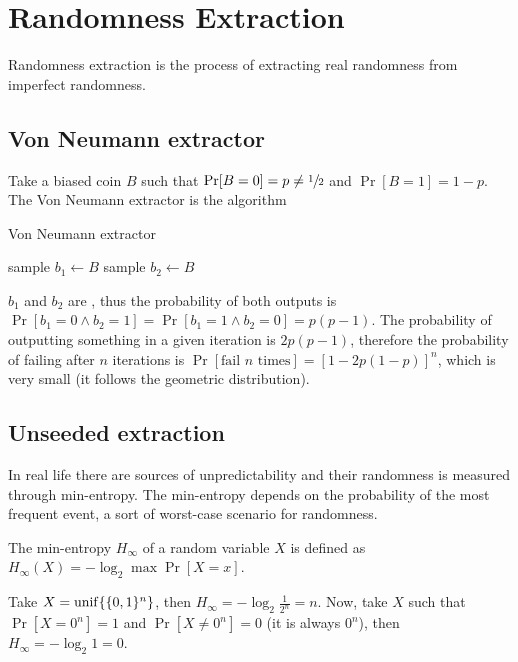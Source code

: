 
\section{Randomness Extraction}
Randomness extraction is the process of extracting real randomness from imperfect randomness.


\subsection{Von Neumann extractor}
Take a biased coin $B$ such that $\Pr[B = 0] = p \neq \sfrac{1}{2}$ and $\Pr[B = 1] = 1 - p$.
The Von Neumann extractor is the algorithm
%
\begin{algorithm}[H]
	\caption{Von Neumann extractor}\label{alg:von-neumann-extractor}
	\begin{algorithmic}
		\Do
			\State sample $b_1 \gets B$
			\State sample $b_2 \gets B$
	\end{algorithmic}
\end{algorithm}

$b_1$ and $b_2$ are \iid, thus the probability of both outputs is $\Pr[b_1 = 0 \wedge b_2 = 1] = \Pr[b_1 = 1 \wedge b_2 = 0] = p(p-1)$.
The probability of outputting something in a given iteration is $2p(p-1)$, therefore the probability of failing after $n$ iterations is $\Pr[\text{fail }n \text{ times}] = [1 -2p(1-p)]^n$, which is very small (it follows the geometric distribution).


\subsection{Unseeded extraction}
In real life there are sources of unpredictability and their randomness is measured through min-entropy.
The min-entropy depends on the probability of the most frequent event, a sort of worst-case scenario for randomness.

\begin{definition}
	The min-entropy $H_{\infty}$ of a random variable $X$ is defined as $H_{\infty}(X) = - \log_2 \max \Pr[X = x]$.
\end{definition}

\begin{example}
	Take $X = \operatorname{unif}\{\{0, 1\}^n\}$, then $H_{\infty} = - \log_2 \frac{1}{2^n} = n$.
	Now, take $X$ such that $\Pr[X = 0^n] = 1$ and $\Pr[X \neq 0^n] = 0$ (it is always $0^n$), then $H_{\infty} = - \log_2 1 = 0$.
\end{example}

